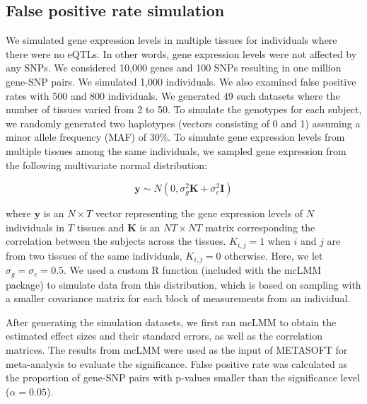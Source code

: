     \subsection{False positive rate simulation}
        We simulated gene expression levels in multiple tissues for individuals where there were no eQTLs. In other words, gene expression levels were not affected by any SNPs. We considered 10,000 genes and 100 SNPs resulting in one million gene-SNP pairs. We simulated 1,000 individuals. We also examined false positive rates with 500 and 800 individuals. We generated 49 such datasets where the number of tissues varied from 2 to 50. To simulate the genotypes for each subject, we randomly generated two haplotypes (vectors consisting of 0 and 1) assuming a minor allele frequency (MAF) of 30\%. To simulate gene expression levels from multiple tissues among the same individuals, we sampled gene expression from the following multivariate normal distribution:
        
        \begin{equation}
            \mathbf{y} \sim N(0,\sigma_g^2\mathbf{K} + \sigma_e^2\mathbf{I} )
        \end{equation}
        
        where $\mathbf{y}$ is an $N \times T$ vector representing the gene expression levels of $N$ individuals in $T$ tissues and $\mathbf{K}$ is an $NT \times NT$ matrix corresponding the correlation between the subjects across the tissues. $K_{i,j} = 1$ when $i$ and $j$ are from two tissues of the same individuals, $K_{i,j} = 0$ otherwise. Here, we let $\sigma_g = \sigma_e = 0.5$. We used a custom R function (included with the mcLMM package) to simulate data from this distribution, which is based on sampling with a smaller covariance matrix for each block of measurements from an individual.
        
        After generating the simulation datasets, we first ran mcLMM to obtain the estimated effect sizes and their standard errors, as well as the correlation matrices. The results from mcLMM were used as the input of METASOFT for meta-analysis to evaluate the significance. False positive rate was calculated as the proportion of gene-SNP pairs with p-values smaller than the significance level ($\alpha = 0.05$).
    
